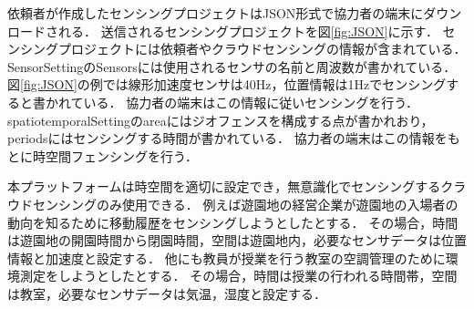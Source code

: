 依頼者が作成したセンシングプロジェクトはJSON形式で協力者の端末にダウンロードされる．
送信されるセンシングプロジェクトを図\ref{fig:JSON}に示す．
センシングプロジェクトには依頼者やクラウドセンシングの情報が含まれている．
SensorSettingのSensorsには使用されるセンサの名前と周波数が書かれている．
図\ref{fig:JSON}の例では線形加速度センサは40Hz，位置情報は1Hzでセンシングすると書かれている．
協力者の端末はこの情報に従いセンシングを行う．
spatiotemporalSettingのareaにはジオフェンスを構成する点が書かれおり，periodsにはセンシングする時間が書かれている．
協力者の端末はこの情報をもとに時空間フェンシングを行う．


本プラットフォームは時空間を適切に設定でき，無意識化でセンシングするクラウドセンシングのみ使用できる．
例えば遊園地の経営企業が遊園地の入場者の動向を知るために移動履歴をセンシングしようとしたとする．
その場合，時間は遊園地の開園時間から閉園時間，空間は遊園地内，必要なセンサデータは位置情報と加速度と設定する．
他にも教員が授業を行う教室の空調管理のために環境測定をしようとしたとする．
その場合，時間は授業の行われる時間帯，空間は教室，必要なセンサデータは気温，湿度と設定する．




